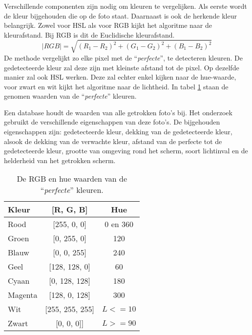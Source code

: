 Verschillende componenten zijn nodig om kleuren te vergelijken. Als eerste wordt de kleur bijgehouden die op de foto staat. Daarnaast is ook de herkende kleur belangrijk. Zowel voor HSL als voor RGB kijkt het algoritme naar de kleurafstand. Bij RGB is dit de Euclidische kleurafstand. 
$$ \mid RGB \mid = \sqrt{(R_1 - R_2)^2 + (G_1 - G_2)^2 + (B_1 - B_2)^2}$$
De methode vergelijkt zo elke pixel met de ``{\it perfecte}'', te detecteren kleuren. De gedetecteerde kleur zal deze zijn met kleinste afstand tot de pixel. Op dezelfde manier zal ook HSL werken. Deze zal echter enkel kijken naar de hue-waarde, voor zwart en wit kijkt het algoritme naar de lichtheid. In tabel \ref{tab:kleuren}  staan de genomen waarden van de ``{\it perfecte}'' kleuren.

Een database houdt de waarden van alle getrokken foto's bij. Het onderzoek gebruikt de verschillende eigenschappen van deze foto's. De bijgehouden eigenschappen zijn: gedetecteerde kleur, dekking van de gedetecteerde kleur, alsook de dekking van de verwachte kleur, afstand van de perfecte tot de gedetecteerde kleur, grootte van omgeving rond het scherm, soort lichtinval en de helderheid van het getrokken scherm.

\begin{center}
\begin{table}
\centering
\begin{tabular}{ | l | c | c | }
\hline
Kleur & [R, G, B] & Hue \\
\hline
Rood & [255, 0, 0] & 0 en 360 \\
Groen & [0, 255, 0] & 120 \\
Blauw & [0, 0, 255] & 240 \\
Geel & [128, 128, 0] & 60 \\
Cyaan & [0, 128, 128] & 180 \\
Magenta & [128, 0, 128] & 300 \\
Wit & [255, 255, 255] & $L <= 10$ \\
Zwart & [0, 0, 0]] & $L >= 90$ \\
\hline
\end{tabular}
\caption{De RGB en hue waarden van de ``{\it perfecte}'' kleuren.}
\label{tab:kleuren}
\end{table}
\end{center}